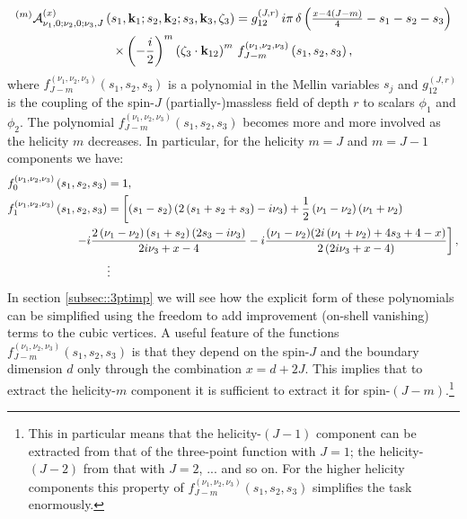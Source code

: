 \documentclass[11pt,a4paper]{article}
\begin{document}
\begin{multline}\label{helicitym}
    {}^{\left(m\right)}{\cal A}^{\left(x\right)}_{\nu_1,0;\nu_2,0;\nu_3,J}\left(s_1,{\bf k}_1;s_2,{\bf k}_2;s_3,{\bf k}_3,\zeta_3\right) = g^{\left(J,r\right)}_{12}\,i\pi\,  \delta\left(\tfrac{x-4\left(J-m\right)}{4}-s_1-s_2-s_3\right) \\ \times \left(-\frac{i}{2}\right)^m \left(\zeta_3 \cdot {\bf k}_{12}\right)^m\,f^{\left(\nu_1,\nu_2,\nu_3\right)}_{J-m}\left(s_1,s_2,s_3\right),
\end{multline}
where $f^{\left(\nu_1,\nu_2,\nu_3\right)}_{J-m}\left(s_1,s_2,s_3\right)$ is a polynomial in the Mellin variables $s_j$ and $g^{\left(J,r\right)}_{12}$ is the coupling of the spin-$J$ (partially-)massless field of depth $r$ to scalars $\phi_1$ and $\phi_2$. The polynomial $f^{\left(\nu_1,\nu_2,\nu_3\right)}_{J-m}\left(s_1,s_2,s_3\right)$ becomes more and more involved as the helicity $m$ decreases. In particular, for the helicity $m=J$ and $m=J-1$ components we have:
\begin{subequations}\label{polyf}
\begin{align}
    f^{\left(\nu_1,\nu_2,\nu_3\right)}_{0}\left(s_1,s_2,s_3\right)&=1,\\
    f^{\left(\nu_1,\nu_2,\nu_3\right)}_{1}\left(s_1,s_2,s_3\right)&=\left[\left(s_1-s_2\right)\left(2\left(s_1+s_2+s_3\right)-i \nu_3\right) +\frac{1}{2} \left(\nu_1-\nu_2\right)\left(\nu_1+\nu_2\right)\right. \label{f1} \\ & \hspace*{-1cm}\left.-i\frac{2\left(\nu_1-\nu_2\right)\left(s_1+s_2\right)(2 s_3-i \nu_3)}{2 i \nu_3+x-4}-i\frac{(\nu_1-\nu_2) (2 i \left(\nu_1+\nu_2\right)+4 s_3+4-x)}{2\left(2 i \nu_3+x-4\right)} \right],\nonumber \\
    & \vdots \nonumber
\end{align}
\end{subequations}
In section \ref{subsec::3ptimp} we will see how the explicit form of these polynomials can be simplified using the freedom to add improvement (on-shell vanishing) terms to the cubic vertices. A useful feature of the functions $f^{\left(\nu_1,\nu_2,\nu_3\right)}_{J-m}\left(s_1,s_2,s_3\right)$ is that they depend on the spin-$J$ and the boundary dimension $d$ only through the combination $x = d+2J$. This implies that to extract the helicity-$m$ component it is sufficient to extract it for spin-$\left(J-m\right)$.\footnote{This in particular means that the helicity-$\left(J-1\right)$ component can be extracted from that of the three-point function with $J=1$; the helicity-$\left(J-2\right)$ from that with $J=2$, ... and so on. For the higher helicity components this property of $f^{\left(\nu_1,\nu_2,\nu_3\right)}_{J-m}\left(s_1,s_2,s_3\right)$ simplifies the task enormously.}
\end{document}
